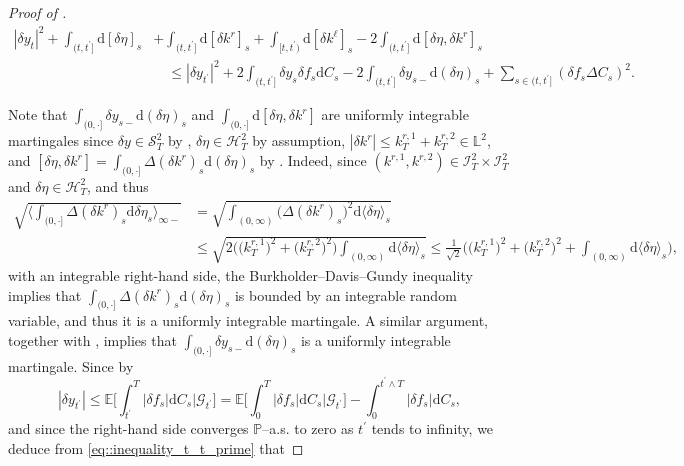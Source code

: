 \documentclass[10pt]{article} %
\newcommand\cG{\mathcal G}
\newcommand\cH{\mathcal H}
\newcommand\cI{\mathcal I}
\newcommand\cS{\mathcal S}
\def \E{\mathbb{E}}
\def \L{\mathbb{L}}
\def \P{\mathbb{P}}
\newcommand{\1}{\mathbf{1}}
\def\d{\mathrm{d}}
\begin{document}
\begin{proof}[Proof of ]
\begin{align}\label{eq::inequality_t_t_prime}
	|\delta y_t|^2 + \int_{(t,t^\prime]}\d[\delta\eta]_s & + \int_{(t,t^\prime]}\d[\delta k^r]_s + \int_{[t,t^\prime)} \d[\delta k^\ell]_s - 2\int_{(t,t^\prime]}\d[\delta\eta,\delta k^r]_s \nonumber\\
	&\quad \leq |\delta y_{t^\prime}|^2 + 2\int_{(t,t^\prime]} \delta y_{s} \delta f_s  \d C_s - 2 \int_{(t,t^\prime]} \delta y_{s-} \d (\delta \eta)_s + \sum_{s \in (t,t^\prime]} (\delta f_s\Delta C_s)^2.
\end{align}

Note that $\int_{(0,\cdot]}\delta y_{s-}\d(\delta\eta)_s$ and $\int_{(0,\cdot]}\d[\delta\eta,\delta k^r]$ are uniformly integrable martingales since $\delta y \in \cS^2_T$ by , $\delta\eta \in \cH^2_T$ by assumption, $|\delta k^r| \leq k^{r,1}_T + k^{r,2}_T \in \L^2$, and $[\delta\eta,\delta k^r] = \int_{(0,\cdot]} \Delta(\delta k^r)_s\d(\delta\eta)_s$ by \cite[Proposition I.4.49]{jacod2003limit}. Indeed, since $ (k^{r,1}, k^{r,2}) \in \cI^2_T \times \cI^2_T$ and $\delta \eta \in \cH^2_T$, and thus
\begin{align*}
	\sqrt{\bigg\langle \int_{(0,\cdot]} \Delta (\delta k^r)_s \d \delta \eta_s \bigg\rangle_{\infty-}} 
	&= \sqrt{\int_{(0,\infty)} \big(\Delta (\delta k^r)_s\big)^2 \d \langle\delta \eta \rangle_s} \\
	&\leq \sqrt{2 \Big(\big(k^{r,1}_T\big)^2 + \big(k^{r,2}_T\big)^2\Big) \int_{(0,\infty)} \d \langle \delta \eta \rangle_s} 
	\leq \frac{1}{\sqrt{2}} \bigg(\big(k^{r,1}_T\big)^2 + \big(k^{r,2}_T\big)^2 + \int_{(0,\infty)} \d \langle \delta \eta \rangle_s \bigg),
\end{align*}
with an integrable right-hand side, the Burkholder--Davis--Gundy inequality implies that $\int_{(0,\cdot]} \Delta(\delta k^r)_s\d(\delta\eta)_s$ is bounded by an integrable random variable, and thus it is a uniformly integrable martingale. A similar argument, together with , implies that $\int_{(0,\cdot]}\delta y_{s-}\d(\delta\eta)_s$ is a uniformly integrable martingale.
Since by 
\begin{equation*}
	|\delta y_{t^\prime}| \leq \E\bigg[\int_{t^\prime}^T |\delta f_s|\d C_s\bigg| \cG_{t^\prime}\bigg] = \E\bigg[\int_0^T |\delta f_s|\d C_s\bigg| \cG_{t^\prime}\bigg] - \int_0^{t^\prime \land T} |\delta f_s|\d C_s,
\end{equation*}
and since the right-hand side converges $\P$--a.s. to zero as $t^\prime$ tends to infinity, we deduce from \eqref{eq::inequality_t_t_prime} that

\end{proof}
\end{document}
